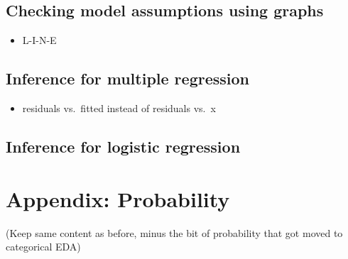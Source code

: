 \documentclass[]{book}
\providecommand{\tightlist}{%
  \setlength{\itemsep}{0pt}\setlength{\parskip}{0pt}}
\begin{document}
\hypertarget{checking-model-assumptions-using-graphs}{%
\section{Checking model assumptions using graphs}\label{checking-model-assumptions-using-graphs}}

\begin{itemize}
\tightlist
\item
  L-I-N-E
\end{itemize}

\hypertarget{inference-for-multiple-regression}{%
\section{Inference for multiple regression}\label{inference-for-multiple-regression}}

\begin{itemize}
\tightlist
\item
  residuals vs.~fitted instead of residuals vs.~x
\end{itemize}

\hypertarget{inference-for-logistic-regression}{%
\section{Inference for logistic regression}\label{inference-for-logistic-regression}}

\hypertarget{probability}{%
\chapter{Appendix: Probability}\label{probability}}

(Keep same content as before, minus the bit of probability that got moved to categorical EDA)


\end{document}
